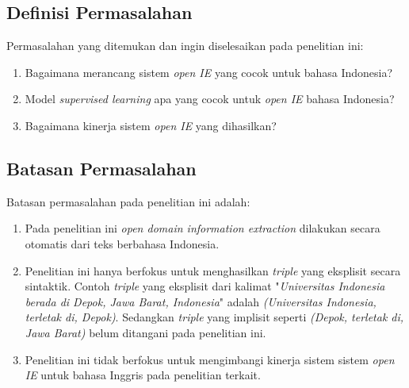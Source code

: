 \subsection{Definisi Permasalahan}

Permasalahan yang ditemukan dan ingin diselesaikan pada penelitian ini:

\begin{enumerate}
\item Bagaimana merancang sistem \textit{open IE} yang cocok untuk bahasa Indonesia?
\item Model \textit{supervised learning} apa yang cocok untuk \textit{open IE} bahasa Indonesia?
\item Bagaimana kinerja sistem \textit{open IE} yang dihasilkan?
\end{enumerate}

\subsection{Batasan Permasalahan}

Batasan permasalahan pada penelitian ini adalah:

\begin{enumerate}
	\item Pada penelitian ini \textit{open domain information extraction} dilakukan secara otomatis dari teks berbahasa Indonesia.
	
	\item Penelitian ini hanya berfokus untuk menghasilkan \textit{triple} yang eksplisit secara sintaktik. Contoh \textit{triple} yang eksplisit dari kalimat "\textit{Universitas Indonesia berada di Depok, Jawa Barat, Indonesia}" adalah \textit{(Universitas Indonesia, terletak di, Depok)}. Sedangkan \textit{triple} yang implisit seperti \textit{(Depok, terletak di, Jawa Barat)} belum ditangani pada penelitian ini.
	
	\item Penelitian ini tidak berfokus untuk mengimbangi kinerja sistem sistem \textit{open IE} untuk bahasa Inggris pada penelitian terkait.

\end{enumerate}

